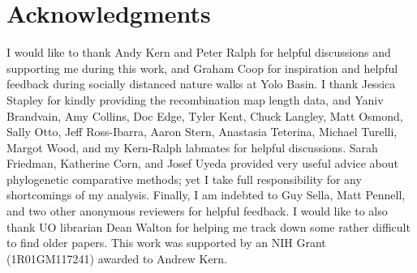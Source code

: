 \documentclass[9pt,lineno]{elife}
\begin{document}
\section{Acknowledgments}

I would like to thank Andy Kern and Peter Ralph for helpful discussions and
supporting me during this work, and Graham Coop for inspiration and helpful
feedback during socially distanced nature walks at Yolo Basin. I thank Jessica
Stapley for kindly providing the recombination map length data, and Yaniv
Brandvain, Amy Collins, Doc Edge, Tyler Kent, Chuck Langley, Matt Osmond, Sally
Otto, Jeff Ross-Ibarra, Aaron Stern, Anastasia Teterina, Michael Turelli,
Margot Wood, and my Kern-Ralph labmates for helpful discussions. Sarah
Friedman, Katherine Corn, and Josef Uyeda provided very useful advice about
phylogenetic comparative methods; yet I take full responsibility for any
shortcomings of my analysis. Finally, I am indebted to Guy Sella, Matt Pennell,
and two other anonymous reviewers for helpful feedback. I would like to also
thank UO librarian Dean Walton for helping me track down some rather difficult
to find older papers.  This work was supported by an NIH Grant (1R01GM117241)
awarded to Andrew Kern.



\end{document}

